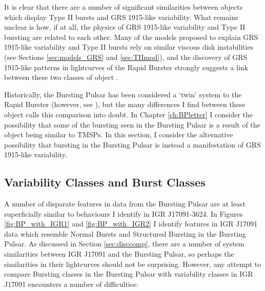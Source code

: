 \par It is clear that there are a number of significant similarities between objects which display Type II bursts and GRS 1915-like variability.  What remains unclear is how, if at all, the physics of GRS 1915-like variability and Type II bursting are related to each other.  Many of the models proposed to explain GRS 1915-like variability and Type II bursts rely on similar viscous disk instabilities (see Sections \ref{sec:models_GRS} and \ref{sec:TIImod}), and the discovery of GRS 1915-like patterns in lightcurves of the Rapid Burster strongly suggests a link between these two classes of object \citep{Bagnoli_RB}.
\par Historically, the Bursting Pulsar has been considered a `twin' system to the Rapid Burster (however, see \citealp{Lewin_BP}), but the many differences I find between these object calls this comparison into doubt.  In Chapter \ref{ch:BPletter} I consider the possibility that some of the bursting seen in the Bursting Pulsar is a result of the object being similar to TMSPs.  In this section, I consider the alternative possibility that bursting in the Bursting Pulsar is instead a manifestation of GRS 1915-like variability.

\subsection{Variability Classes and Burst Classes}

\par A number of disparate features in data from the Bursting Pulsar are at least superficially similar to behaviours I identify in IGR J17091-3624.  In Figures \ref{fig:BP_with_IGR1} and \ref{fig:BP_with_IGR2} I identify features in IGR J17091 data which resemble Normal Bursts and Structured Bursting in the Bursting Pulsar.  As discussed in Section \ref{sec:disccomp}, there are a number of system similarities between IGR J17091 and the Bursting Pulsar, so perhaps the similarities in their lightcurves should not be surprising.  However, any attempt to compare Bursting classes in the Bursting Pulsar with variability classes in IGR J17091 encounters a number of difficulties:

